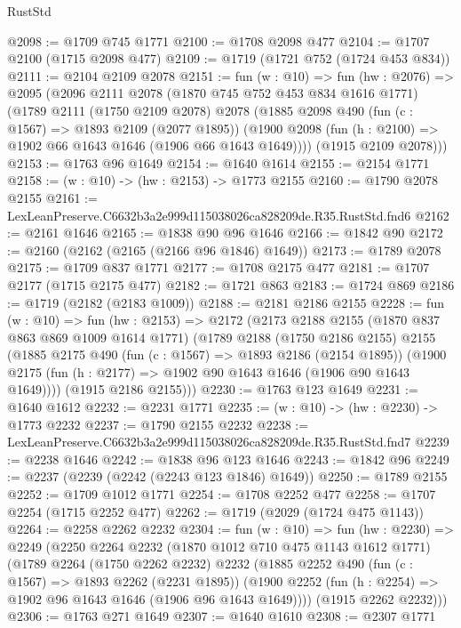 \begin{lexlean}{RustStd}
\begin{coremodule}
@2098 := @1709 @745 @1771
@2100 := @1708 @2098 @477
@2104 := @1707 @2100 (@1715 @2098 @477)
@2109 := @1719 (@1721 @752 (@1724 @453 @834))
@2111 := @2104 @2109 @2078
@2151 := fun (w : @10) =>
  fun (hw : @2076) =>
  @2095
    (@2096
      @2111
      @2078
      (@1870 @745 @752 @453 @834 @1616 @1771)
      (@1789
        @2111
        (@1750 @2109 @2078)
        @2078
        (@1885
          @2098
          @490
          (fun (c : @1567) => @1893 @2109 (@2077 @1895))
          (@1900 @2098 (fun (h : @2100) => @1902 @66 @1643 @1646 (@1906 @66 @1643 @1649))))
        (@1915 @2109 @2078)))
@2153 := @1763 @96 @1649
@2154 := @1640 @1614
@2155 := @2154 @1771
@2158 := (w : @10) -> (hw : @2153) -> @1773 @2155
@2160 := @1790 @2078 @2155
@2161 := LexLeanPreserve.C6632b3a2e999d115038026ca828209de.R35.RustStd.fnd6
@2162 := @2161 @1646
@2165 := @1838 @90 @96 @1646
@2166 := @1842 @90
@2172 := @2160 (@2162 (@2165 (@2166 @96 @1846) @1649))
@2173 := @1789 @2078
@2175 := @1709 @837 @1771
@2177 := @1708 @2175 @477
@2181 := @1707 @2177 (@1715 @2175 @477)
@2182 := @1721 @863
@2183 := @1724 @869
@2186 := @1719 (@2182 (@2183 @1009))
@2188 := @2181 @2186 @2155
@2228 := fun (w : @10) =>
  fun (hw : @2153) =>
  @2172
    (@2173
      @2188
      @2155
      (@1870 @837 @863 @869 @1009 @1614 @1771)
      (@1789
        @2188
        (@1750 @2186 @2155)
        @2155
        (@1885
          @2175
          @490
          (fun (c : @1567) => @1893 @2186 (@2154 @1895))
          (@1900 @2175 (fun (h : @2177) => @1902 @90 @1643 @1646 (@1906 @90 @1643 @1649))))
        (@1915 @2186 @2155)))
@2230 := @1763 @123 @1649
@2231 := @1640 @1612
@2232 := @2231 @1771
@2235 := (w : @10) -> (hw : @2230) -> @1773 @2232
@2237 := @1790 @2155 @2232
@2238 := LexLeanPreserve.C6632b3a2e999d115038026ca828209de.R35.RustStd.fnd7
@2239 := @2238 @1646
@2242 := @1838 @96 @123 @1646
@2243 := @1842 @96
@2249 := @2237 (@2239 (@2242 (@2243 @123 @1846) @1649))
@2250 := @1789 @2155
@2252 := @1709 @1012 @1771
@2254 := @1708 @2252 @477
@2258 := @1707 @2254 (@1715 @2252 @477)
@2262 := @1719 (@2029 (@1724 @475 @1143))
@2264 := @2258 @2262 @2232
@2304 := fun (w : @10) =>
  fun (hw : @2230) =>
  @2249
    (@2250
      @2264
      @2232
      (@1870 @1012 @710 @475 @1143 @1612 @1771)
      (@1789
        @2264
        (@1750 @2262 @2232)
        @2232
        (@1885
          @2252
          @490
          (fun (c : @1567) => @1893 @2262 (@2231 @1895))
          (@1900 @2252 (fun (h : @2254) => @1902 @96 @1643 @1646 (@1906 @96 @1643 @1649))))
        (@1915 @2262 @2232)))
@2306 := @1763 @271 @1649
@2307 := @1640 @1610
@2308 := @2307 @1771

\end{coremodule}
\end{lexlean}
